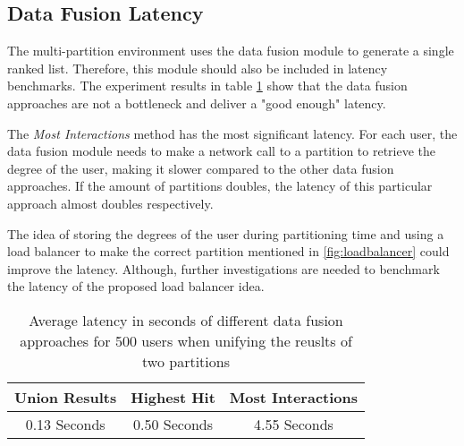 \subsection{Data Fusion Latency}
\label{subsec:data-fusion-latency}
The multi-partition environment uses the data fusion module to generate a single ranked list. Therefore, this module should also be included in latency benchmarks. The experiment results in table \ref{tab:data-fusion-latency} show that the data fusion approaches are not a bottleneck and deliver a "good enough" latency.


The \emph{Most Interactions} method has the most significant latency. For each user, the data fusion module needs to make a network call to a partition to retrieve the degree of the user, making it slower compared to the other data fusion approaches. If the amount of partitions doubles, the latency of this particular approach almost doubles respectively.


The idea of storing the degrees of the user during partitioning time and using a load balancer to make the correct partition mentioned in \ref{fig:loadbalancer} could improve the latency. Although, further investigations are needed to benchmark the latency of the proposed load balancer idea.


\begin{table}[!htb]
    \centering
    \caption{Average latency in seconds of different data fusion approaches for 500 users when unifying the reuslts of two partitions}
    \label{tab:data-fusion-latency}
    \begin{tabular}{|c|c|c|}
        \hline
        \textbf{Union Results} & \textbf{Highest Hit} & \textbf{Most Interactions} \\
        \hline
        0.13 Seconds & 0.50 Seconds & 4.55 Seconds \\
        \hline
    \end{tabular}
\end{table}

